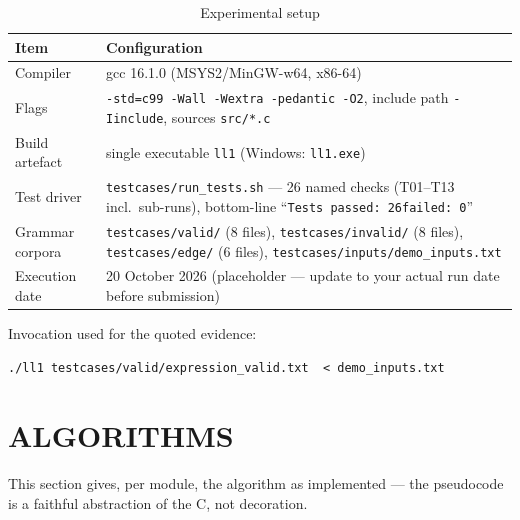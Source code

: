 \documentclass[12pt,a4paper,oneside,openany]{report}
\newcommand{\code}[1]{\texttt{#1}}
\begin{document}
\begin{table}[h]
  \caption{Experimental setup}
  \label{tab:setup}
  \small
  \begin{tabularx}{\textwidth}{p{3.4cm}X}
    \toprule
    \textbf{Item} & \textbf{Configuration} \\
    \midrule
    Compiler & gcc 16.1.0 (MSYS2/MinGW-w64, x86-64) \\
    Flags & \texttt{-std=c99 -Wall -Wextra -pedantic -O2}, include path
    \texttt{-Iinclude}, sources \texttt{src/*.c} \\
    Build artefact & single executable \code{ll1} (Windows: \code{ll1.exe}) \\
    Test driver & \code{testcases/run\_tests.sh} --- 26 named checks
    (T01--T13 incl.\ sub-runs), bottom-line
    ``\code{Tests passed: 26\quad failed: 0}'' \\
    Grammar corpora & \code{testcases/valid/} (8 files), 
    \code{testcases/invalid/} (8 files), \code{testcases/edge/} (6 files),
    \code{testcases/inputs/demo\_inputs.txt} \\
    Execution date & 20 October 2026 (placeholder --- update to
    your actual run date before submission) \\
    \bottomrule
  \end{tabularx}
\end{table}

\noindent Invocation used for the quoted evidence:
\begin{lstlisting}[style=outputcode]
  ./ll1 testcases/valid/expression_valid.txt  < demo_inputs.txt
\end{lstlisting}

\section{ALGORITHMS}
This section gives, per module, the algorithm as implemented --- the
pseudocode is a faithful abstraction of the C, not decoration.
\end{document}
